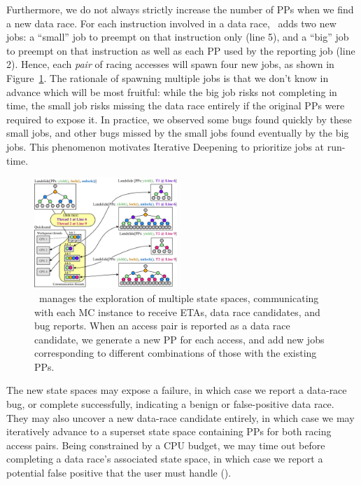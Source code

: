 Furthermore, we do not always strictly increase the number of PPs when we find a new data race.
For each instruction involved in a data race, \quicksand~adds two new jobs:
a ``small'' job to preempt on that instruction only (line 5),
and a ``big'' job to preempt on that instruction as well as each PP used by the reporting job (line 2).
%
Hence,
each {\em pair} of racing accesses will spawn four new jobs, as shown in Figure~\ref{fig:new-dr-jobs}.
%
The rationale of spawning multiple jobs is that we don't know in advance which will be most fruitful:
while the big job risks not completing in time,
the small job risks missing the data race entirely if the original PPs were required to expose it.
In practice, we observed some bugs found quickly by these small jobs, and other bugs missed by the small jobs found eventually by the big jobs.
This phenomenon motivates Iterative Deepening to prioritize jobs at run-time.

\begin{figure}[t]
	\includegraphics[width=0.48\textwidth]{dr-jobs-v2.pdf}
	\caption{\quicksand~manages the exploration of multiple state spaces, communicating with each MC instance to receive ETAs, data race candidates, and bug reports.
		When an access pair is reported as a data race candidate, we generate a new PP for each access, and add new jobs corresponding to different combinations of those with the existing PPs.}
	\label{fig:new-dr-jobs}
\end{figure}

The new state spaces may expose a failure, in which case we report a data-race bug,
or complete successfully, indicating a benign or false-positive data race.
They may also uncover a new data-race candidate entirely, %
in which case we may iteratively advance to a superset state space containing PPs for both racing access pairs.
Being constrained by a CPU budget,
we may time out before completing a data race's associated state space,
in which case we report a potential false positive that the user must handle (\sect{\ref{sec:future}}).

